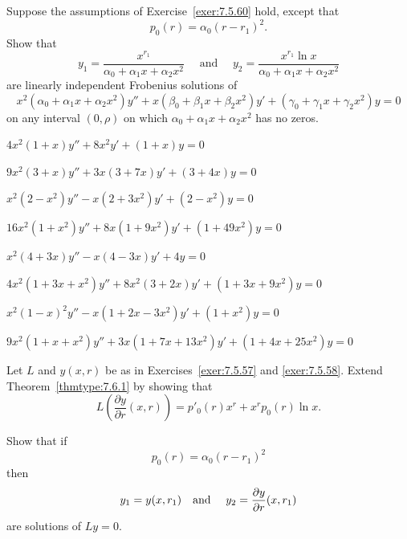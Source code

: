 \begin{exerciselist}
  \item\label{exer:7.6.57} Suppose the assumptions of Exercise~\ref{exer:7.5.60}
        hold, except that
  \[
    p_{0}(r)=\alpha_{0}(r-r_{1})^{2}.
  \]
  Show that
  \[
    y_{1}=\frac{x^{r_{1}}}{\alpha_{0}+\alpha_{1}x+\alpha_{2}x^{2}}\quad\mbox{ and }\quad y_{2}=\frac{x^{r_{1}}\ln x}{\alpha_{0}+\alpha_{1}x+\alpha_{2}x^{2}}
  \]
  are linearly independent Frobenius solutions of
  \[
    x^{2}(\alpha_{0}+\alpha_{1}x+\alpha_{2}x^{2})y''+x(\beta_{0}+\beta_{1}x+\beta_{2}x^{2})y'+ (\gamma_{0}+\gamma_{1}x+\gamma_{2}x^{2})y=0
  \]
  on any interval $(0,\rho)$ on which $\alpha_{0}+\alpha_{1}x+\alpha_{2}x^{2}$ has no zeros.


  \item\label{exer:7.6.58} $4x^{2}(1+x)y''+8x^{2}y'+(1+x)y=0$

  \item\label{exer:7.6.59} $9x^{2}(3+x)y''+3x(3+7x)y'+(3+4x)y=0$

  \item\label{exer:7.6.60} $x^{2}(2-x^{2})y''-x(2+3x^{2})y'+(2-x^{2})y=0$

  \item\label{exer:7.6.61} $16x^{2}(1+x^{2})y''+8x(1+9x^{2})y'+(1+49x^{2})y=0$

  \item\label{exer:7.6.62} $x^{2}(4+3x)y''-x(4-3x)y'+4y=0$

  \item\label{exer:7.6.63} $4x^{2}(1+3x+x^{2})y''+8x^{2}(3+2x)y'+(1+3x+9x^{2})y=0$

  \item\label{exer:7.6.64} $x^{2}(1-x)^{2}y''-x(1+2x-3x^{2})y'+(1+x^{2})y=0$

  \item\label{exer:7.6.65} $9x^{2}(1+x+x^{2})y''+3x(1+7x+13x^{2})y'+(1+4x+25x^{2})y=0$

  \item\label{exer:7.6.66}
  \begin{alist}
    \item %
    Let $L$ and $y(x,r)$ be as in Exercises~\ref{exer:7.5.57} and \ref{exer:7.5.58}. Extend
    Theorem~\ref{thmtype:7.6.1} by showing that
    \[
      L\left(\frac{\partial y}{\partial r}(x,r)\right)=p'_{0}(r)x^{r}+x^{r}p_{0}(r)\ln x.
    \]

    \item %
    Show that if
    \[
      p_{0}(r)=\alpha_{0}(r-r_{1})^{2}
    \]
    then
    \[
      y_{1}=y(x,r_{1})\mbox{\quad and \quad}y_{2}=\frac{\partial y}{\partial r}(x,r_{1})
    \]
    are solutions of $Ly=0$.
  \end{alist}
\end{exerciselist}
